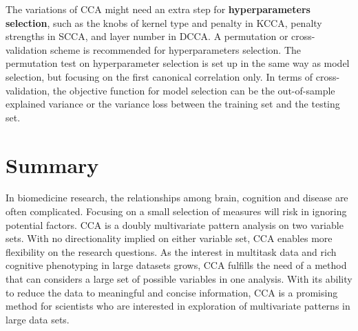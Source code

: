 The variations of CCA might need an extra step for \textbf{hyperparameters selection}, such as the knobs of kernel type and penalty in KCCA, penalty strengths in SCCA, and layer number in DCCA. A permutation or cross-validation scheme is recommended for hyperparameters selection. The permutation test on hyperparameter selection is set up in the same way as model selection, but focusing on the first canonical correlation only\cite<For example, see Appendix A in>{WittenSCCA2009}. In terms of cross-validation, the objective function for model selection can be the out-of-sample explained variance or the variance loss between the training set and the testing set. 

\section{Summary}
\label{ch:methods:summary}
In biomedicine research, the relationships among brain, cognition and disease are often complicated. Focusing on a small selection of measures will risk in ignoring potential factors. CCA is a doubly multivariate pattern analysis on two variable sets.  With no directionality implied on either variable set, CCA enables more flexibility on the research questions. As the interest in multitask data and rich cognitive phenotyping in large datasets grows, CCA fulfills the need of a method that can considers a large set of possible variables in one analysis. With its ability to reduce the data to meaningful and concise information, CCA is a promising method for scientists who are interested in exploration of multivariate patterns in large data sets.
